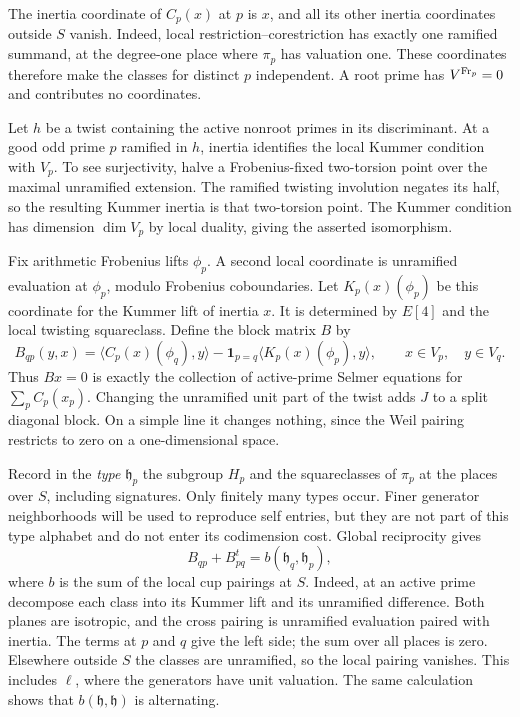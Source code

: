 The inertia coordinate of $C_p(x)$ at $p$ is $x$, and all its other
inertia coordinates outside $S$ vanish. Indeed, local
restriction--corestriction has exactly one ramified summand, at the
degree-one place where $\pi_p$ has valuation one. These coordinates
therefore make the classes for distinct $p$ independent. A root prime
has $V^{\operatorname{Fr}_p}=0$ and contributes no coordinates.

Let $h$ be a twist containing the active nonroot primes in its
discriminant. At a good odd prime $p$ ramified in $h$, inertia identifies
the local Kummer condition with $V_p$. To see surjectivity, halve a
Frobenius-fixed two-torsion point over the maximal unramified extension.
The ramified twisting involution negates its half, so the resulting
Kummer inertia is that two-torsion point. The Kummer condition has
dimension $\dim V_p$ by local duality, giving the asserted isomorphism.

Fix arithmetic Frobenius lifts $\phi_p$. A second local coordinate is
unramified evaluation at $\phi_p$, modulo Frobenius coboundaries.
Let $K_p(x)(\phi_p)$ be this coordinate for the Kummer lift of inertia
$x$. It is determined by $E[4]$ and the local twisting squareclass.
Define the block matrix $B$ by
\begin{equation}\label{eq:lm:raw-matrix}
 B_{qp}(y,x)=\langle C_p(x)(\phi_q),y\rangle
 -\mathbf1_{p=q}\langle K_p(x)(\phi_p),y\rangle,
 \qquad x\in V_p,\quad y\in V_q.
\end{equation}
Thus $Bx=0$ is exactly the collection of active-prime Selmer equations
for $\sum_p C_p(x_p)$. Changing the unramified unit part of the twist
adds $J$ to a split diagonal block. On a simple line it changes nothing,
since the Weil pairing restricts to zero on a one-dimensional space.

Record in the \emph{type} $\mathfrak h_p$ the subgroup $H_p$ and the
squareclasses of $\pi_p$ at the places over $S$, including signatures.
Only finitely many types occur. Finer generator neighborhoods will be
used to reproduce self entries, but they are not part of this type
alphabet and do not enter its codimension cost. Global reciprocity gives
\begin{equation}\label{eq:lm:symmetry-defect}
 B_{qp}+B_{pq}^{t}=b(\mathfrak h_q,\mathfrak h_p),
\end{equation}
where $b$ is the sum of the local cup pairings at $S$.
Indeed, at an active prime decompose each class into its Kummer lift
and its unramified difference. Both planes are isotropic, and the
cross pairing is unramified evaluation paired with inertia. The terms
at $p$ and $q$ give the left side; the sum over all places is zero.
Elsewhere outside $S$ the classes are unramified, so the local pairing
vanishes. This includes $\ell$, where the generators have unit valuation.
The same calculation shows that $b(\mathfrak h,\mathfrak h)$ is alternating.

